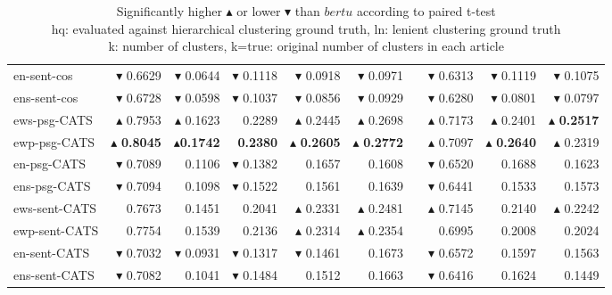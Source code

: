 \begin{table}[t]
\begin{tabular}{@{}lrrrrrrrrr@{}}
en-sent-cos & $\blacktriangledown$ 0.6629 & $\blacktriangledown$ 0.0644 & $\blacktriangledown$ 0.1118 & $\blacktriangledown$ 0.0918 & $\blacktriangledown$ 0.0971 && $\blacktriangledown$ 0.6313 & $\blacktriangledown$ 0.1119 & $\blacktriangledown$ 0.1075 \\ 
ens-sent-cos & $\blacktriangledown$ 0.6728 & $\blacktriangledown$ 0.0598 & $\blacktriangledown$ 0.1037 & $\blacktriangledown$ 0.0856 & $\blacktriangledown$ 0.0929 && $\blacktriangledown$ 0.6280 & $\blacktriangledown$ 0.0801 & $\blacktriangledown$ 0.0797 \\\midrule
ews-psg-CATS & $\blacktriangle$ 0.7953 & $\blacktriangle$ 0.1623 & 0.2289 & $\blacktriangle$ 0.2445 & $\blacktriangle$ 0.2698 && $\blacktriangle$ 0.7173 & $\blacktriangle$ 0.2401 & $\blacktriangle$ \textbf{0.2517} \\ 
ewp-psg-CATS & $\blacktriangle$ \textbf{0.8045} & $\blacktriangle$\textbf{0.1742} & \textbf{0.2380} & $\blacktriangle$ \textbf{0.2605} & $\blacktriangle$ \textbf{0.2772} && $\blacktriangle$ 0.7097 & $\blacktriangle$ \textbf{0.2640} & $\blacktriangle$ 0.2319 \\ 
en-psg-CATS & $\blacktriangledown$ 0.7089 & 0.1106 & $\blacktriangledown$ 0.1382 & 0.1657 & 0.1608 && $\blacktriangledown$ 0.6520 & 0.1688 & 0.1623 \\ 
ens-psg-CATS & $\blacktriangledown$ 0.7094 & 0.1098 & $\blacktriangledown$ 0.1522 & 0.1561 & 0.1639 && $\blacktriangledown$ 0.6441 & 0.1533 & 0.1573 \\\midrule
ews-sent-CATS & 0.7673 & 0.1451 & 0.2041 & $\blacktriangle$ 0.2331 & $\blacktriangle$ 0.2481 && $\blacktriangle$ 0.7145 & 0.2140 & $\blacktriangle$ 0.2242 \\ 
ewp-sent-CATS & 0.7754 & 0.1539 & 0.2136 & $\blacktriangle$ 0.2314 & $\blacktriangle$ 0.2354 && 0.6995 & 0.2008 & 0.2024 \\ 
en-sent-CATS & $\blacktriangledown$ 0.7032 & $\blacktriangledown$ 0.0931 & $\blacktriangledown$ 0.1317 & $\blacktriangledown$ 0.1461 & 0.1673 && $\blacktriangledown$ 0.6572 & 0.1597 & 0.1563 \\ 
ens-sent-CATS & $\blacktriangledown$ 0.7082 & 0.1041 & $\blacktriangledown$ 0.1484 & 0.1512 & 0.1663 && $\blacktriangledown$ 0.6416 & 0.1624 & 0.1449 \\ 
\bottomrule
\end{tabular}
\caption*{Significantly higher $\blacktriangle$ or lower $\blacktriangledown$ than $bertu$ according to paired t-test \\
hq:   evaluated against hierarchical clustering ground truth, ln: lenient clustering ground truth\\
k: number of clusters, k=true: original number of clusters in each article}
\end{table}


